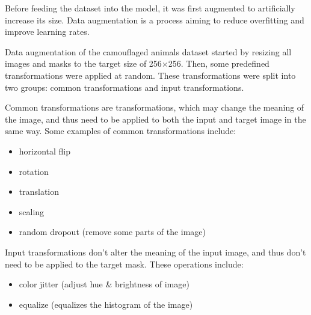 \documentclass[../main.tex]{subfiles}
\begin{document}
Before feeding the dataset into the model, it was first augmented to artificially increase its size. Data augmentation is a process aiming to reduce overfitting and improve learning rates.

Data augmentation of the camouflaged animals dataset started by resizing all images and masks to the target size of 256$\times$256. Then, some predefined transformations were applied at random. These transformations were split into two groups: common transformations and input transformations.

Common transformations are transformations, which may change the meaning of the image, and thus need to be applied to both the input and target image in the same way. Some examples of common transformations include:
\begin{itemize}
	\item horizontal flip
	\item rotation
	\item translation
	\item scaling
	\item random dropout (remove some parts of the image)
\end{itemize}

Input transformations don't alter the meaning of the input image, and thus don't need to be applied to the target mask. These operations include:
\begin{itemize}
	\item color jitter (adjust hue \& brightness of image)
	\item equalize (equalizes the histogram of the image)
\end{itemize}
\end{document}
